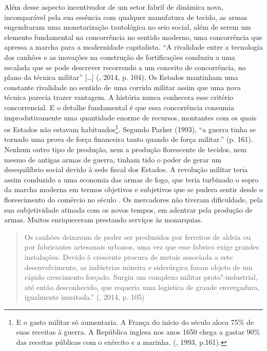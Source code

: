Além desse aspecto incentivador de um setor fabril de dinâmica nova,
incomparável pela sua essência com qualquer manufatura de tecido, as
armas engendraram uma monetarização tautológica no seio social, além de
serem um elemento fundamental na concorrência no sentido moderno, uma
concorrência que apressa a marcha para a modernidade capitalista. ``A
rivalidade entre a tecnologia dos canhões e as inovações na construção
de fortificações conduziu a uma escalada que se pode descrever
recorrendo a um conceito de concorrência, no plano da técnica militar''
[\ldots{}] (, 2014, p. 104). Os Estados mantinham uma constante
rivalidade no sentido de uma corrida militar assim que uma nova técnica
parecia trazer vantagem. A história nunca conhecera esse critério
concorrencial. E o detalhe fundamental é que essa concorrência consumia
improdutivamente uma quantidade enorme de recursos, montantes com os
quais os Estados não estavam habituados\footnote{E o gasto militar só
  aumentaria. A França do início do século  aloca 75\% de suas
  receitas à guerra. A República inglesa nos anos 1650 chega a gastar
  90\% das receitas públicas com o exército e a marinha. (, 1993,
  p.161).}. Segundo Parker (1993), ``a guerra tinha se tornado uma prova
de força financeira tanto quando de força militar.'' (p. 161). Nenhum
outro tipo de produção, nem a produção florescente de tecidos, nem mesmo
de antigas armas de guerra, tinham tido o poder de gerar um
desequilíbrio social devido à sede fiscal dos Estados. A revolução
militar teria assim conduzido a uma economia das armas de fogo, que
teria turbinado o sopro da marcha moderna em termos objetivos e
subjetivos que se pudera sentir desde o florescimento do comércio no
século . Os mercadores não tiveram dificuldade, pela sua subjetividade
atinada com os novos tempos, em adentrar pela produção de armas. Muitos
enriqueceram prestando serviços às monarquias.

\begin{quote}
Os canhões deixavam de poder ser produzidos por ferreiros de aldeia ou
por fabricantes artesanais urbanos, uma vez que esse fabrico exige
grandes instalações. Devido à crescente procura de metais associada a
este desenvolvimento, as indústrias mineira e siderúrgica foram objeto
de um rápido crescimento forçado. Surgiu um complexo militar
proto"-industrial, até então desconhecido, que requeria uma logística de
grande envergadura, igualmente inusitada.'' (, 2014, p. 105)
\end{quote}

